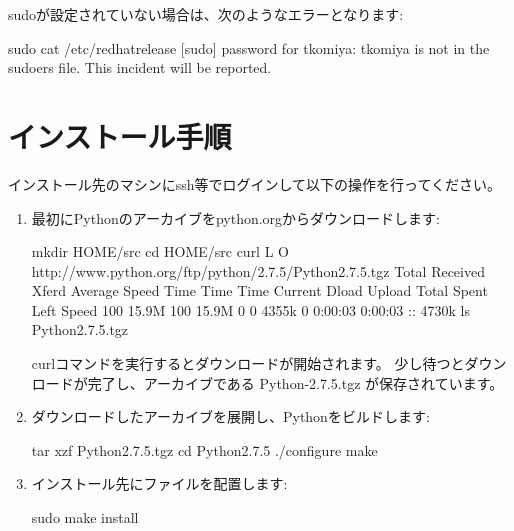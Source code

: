 \documentclass[letterpaper,10pt,dvipdfmx]{sphinxmanual}
\begin{document}
\begin{description}
sudoが設定されていない場合は、次のようなエラーとなります:

%
\begin{sphinxVerbatim}[commandchars=\\\{\}]
\PYGZdl{} sudo cat /etc/redhat\PYGZhy{}release
[sudo] password for tkomiya:
tkomiya is not in the sudoers file.  This incident will be reported.
\end{sphinxVerbatim}

\end{description}


\section{インストール手順}
\label{\detokenize{procedure/installation:id1}}\label{\detokenize{procedure/installation::doc}}
インストール先のマシンにssh等でログインして以下の操作を行ってください。
\begin{enumerate}
\item {} 
最初にPythonのアーカイブをpython.orgからダウンロードします:

%
\begin{sphinxVerbatim}[commandchars=\\\{\}]
\PYGZdl{} mkdir \PYGZdl{}HOME/src
\PYGZdl{} cd \PYGZdl{}HOME/src
\PYGZdl{} curl \PYGZhy{}L \PYGZhy{}O http://www.python.org/ftp/python/2.7.5/Python\PYGZhy{}2.7.5.tgz
  \PYGZpc{} Total    \PYGZpc{} Received \PYGZpc{} Xferd  Average Speed   Time    Time     Time  Current
                              Dload  Upload   Total   Spent    Left  Speed
100 15.9M  100 15.9M    0     0  4355k      0  0:00:03  0:00:03 \PYGZhy{}\PYGZhy{}:\PYGZhy{}\PYGZhy{}:\PYGZhy{}\PYGZhy{} 4730k
\PYGZdl{} ls
Python\PYGZhy{}2.7.5.tgz
\end{sphinxVerbatim}

curlコマンドを実行するとダウンロードが開始されます。
少し待つとダウンロードが完了し、アーカイブである Python-2.7.5.tgz が保存されています。

\item {} 
ダウンロードしたアーカイブを展開し、Pythonをビルドします:

%
\begin{sphinxVerbatim}[commandchars=\\\{\}]
\PYGZdl{} tar xzf Python\PYGZhy{}2.7.5.tgz
\PYGZdl{} cd Python\PYGZhy{}2.7.5
\PYGZdl{} ./configure
\PYGZdl{} make
\end{sphinxVerbatim}

\item {} 
インストール先にファイルを配置します:

%
\begin{sphinxVerbatim}[commandchars=\\\{\}]
\PYGZdl{} sudo make install
\end{sphinxVerbatim}

\end{enumerate}
\end{document}
